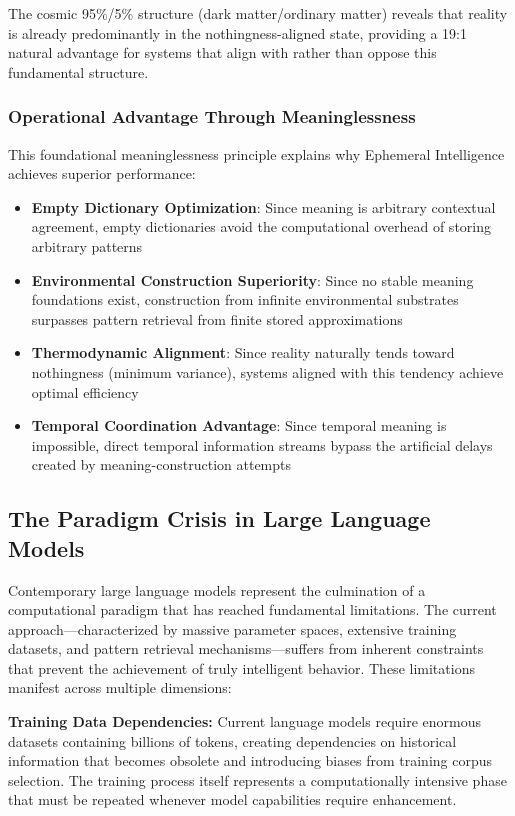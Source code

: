 \documentclass[12pt,a4paper]{article}
\begin{document}
The cosmic 95\%/5\% structure (dark matter/ordinary matter) reveals that reality is already predominantly in the nothingness-aligned state, providing a 19:1 natural advantage for systems that align with rather than oppose this fundamental structure.

\subsubsection{Operational Advantage Through Meaninglessness}

This foundational meaninglessness principle explains why Ephemeral Intelligence achieves superior performance:

\begin{itemize}
\item \textbf{Empty Dictionary Optimization}: Since meaning is arbitrary contextual agreement, empty dictionaries avoid the computational overhead of storing arbitrary patterns
\item \textbf{Environmental Construction Superiority}: Since no stable meaning foundations exist, construction from infinite environmental substrates surpasses pattern retrieval from finite stored approximations
\item \textbf{Thermodynamic Alignment}: Since reality naturally tends toward nothingness (minimum variance), systems aligned with this tendency achieve optimal efficiency
\item \textbf{Temporal Coordination Advantage}: Since temporal meaning is impossible, direct temporal information streams bypass the artificial delays created by meaning-construction attempts
\end{itemize}

\subsection{The Paradigm Crisis in Large Language Models}

Contemporary large language models represent the culmination of a computational paradigm that has reached fundamental limitations. The current approach—characterized by massive parameter spaces, extensive training datasets, and pattern retrieval mechanisms—suffers from inherent constraints that prevent the achievement of truly intelligent behavior. These limitations manifest across multiple dimensions:

\textbf{Training Data Dependencies:} Current language models require enormous datasets containing billions of tokens, creating dependencies on historical information that becomes obsolete and introducing biases from training corpus selection. The training process itself represents a computationally intensive phase that must be repeated whenever model capabilities require enhancement.
\end{document}
